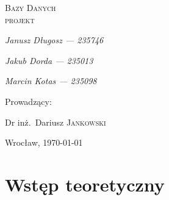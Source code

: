 \documentclass[polish, 11pt]{article}
\begin{document}
\begin{titlepage}
    \centering
    {\scshape\LARGE Bazy Danych\\ projekt \par}
    \vspace{1cm}
   
    {\itshape\Large Janusz Długosz --- 235746\/\par}
    {\itshape\Large Jakub Dorda --- 235013\/\par}
    {\itshape\Large Marcin Kotas --- 235098\/\par}
    \vfill
    Prowadzący:\par
    Dr inż.~Dariusz \textsc{Jankowski}

    \vfill

    {\large Wrocław, \today\par}

\end{titlepage}

\tableofcontents
\newpage

\section{Wstęp teoretyczny}
\end{document}
